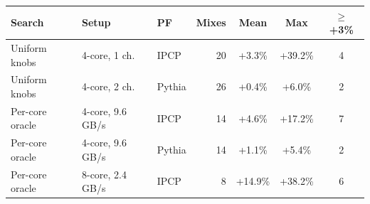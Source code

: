 \begin{tabular}{lllrccc}
\toprule
Search & Setup & PF & Mixes & Mean & Max & $\geq$+3\% \\
\midrule
Uniform knobs & 4-core, 1 ch. & IPCP & 20 & +3.3\% & +39.2\% & 4 \\
Uniform knobs & 4-core, 2 ch. & Pythia & 26 & +0.4\% & +6.0\% & 2 \\
\midrule
Per-core oracle & 4-core, 9.6\,GB/s & IPCP & 14 & +4.6\% & +17.2\% & 7 \\
Per-core oracle & 4-core, 9.6\,GB/s & Pythia & 14 & +1.1\% & +5.4\% & 2 \\
Per-core oracle & 8-core, 2.4\,GB/s & IPCP & 8 & +14.9\% & +38.2\% & 6 \\
\bottomrule
\end{tabular}

